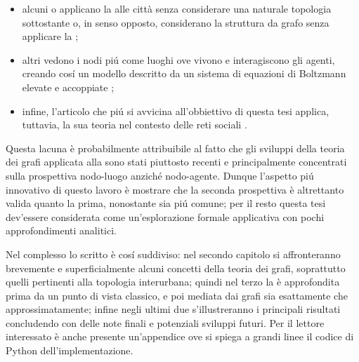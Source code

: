   \begin{itemize}[
    label=\(\diamond\),
    topsep=0.5em,
    parsep=0em,
    itemsep=0.25em,
    leftmargin=2em,
    rightmargin=1.5em,
    labelindent=30pt,
  ]
    \item alcuni o applicano la \TCSMA{} alle città senza considerare una naturale topologia sottostante \cite{Gualandi2019SDC}\footnotemark{} o, in senso opposto, considerano la struttura da grafo senza applicare la \TCSMA{} \cite{Berliant2018};
    \item altri vedono i nodi piú come luoghi ove vivono e interagiscono gli agenti, creando cosí un modello descritto da un sistema di equazioni di Boltzmann elevate e accoppiate \cite{Loy2021};
    \item infine, l'articolo che piú si avvicina all'obbiettivo di questa tesi applica, tuttavia, la sua teoria nel contesto delle reti sociali \cite{Nurisso2024}.
  \end{itemize}

  Questa lacuna è probabilmente attribuibile al fatto che gli sviluppi della teoria dei grafi applicata alla \TCSMA{} sono stati piuttosto recenti e principalmente concentrati sulla prospettiva nodo-luogo anziché nodo-agente. Dunque l'aspetto piú innovativo di questo lavoro è mostrare che la seconda prospettiva è altrettanto valida quanto la prima, nonostante sia piú comune; per il resto questa tesi dev'essere considerata come un'esplorazione formale applicativa con pochi approfondimenti analitici.

  Nel complesso lo scritto è cosí suddiviso: nel secondo capitolo si affronteranno brevemente e superficialmente alcuni concetti della teoria dei grafi, soprattutto quelli pertinenti alla topologia interurbana; quindi nel terzo la \TCSMA{} è approfondita prima da un punto di vista classico, e poi mediata dai grafi sia esattamente che approssimatamente; infine negli ultimi due s'illustreranno i principali risultati concludendo con delle note finali e potenziali sviluppi futuri. Per il lettore interessato è anche presente un'appendice ove si spiega a grandi linee il codice di Python dell'implementazione.
